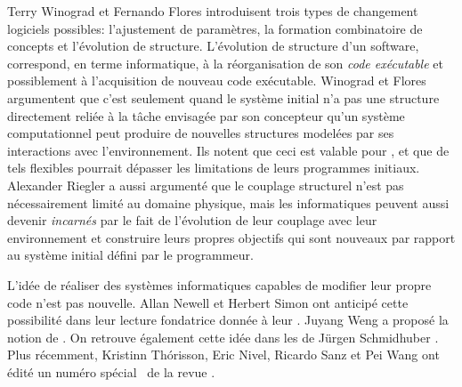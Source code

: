 Terry Winograd et Fernando Flores \cite{winograd_understanding_1987} introduisent trois types de changement logiciels possibles:  l'ajustement de paramètres, la formation combinatoire de concepts et l'évolution de structure.
L'évolution de structure d'un software, correspond, en terme informatique, à la réorganisation de son \emph{code exécutable} et possiblement à l'acquisition de nouveau code exécutable.
Winograd et Flores argumentent que c'est seulement quand le système initial n'a pas une structure directement reliée à la tâche envisagée par son concepteur qu'un système computationnel peut produire de nouvelles structures modelées par ses interactions avec l'environnement. 
Ils notent que ceci est valable pour \og {} \fg, et que de tels  flexibles pourrait dépasser les limitations de leurs programmes initiaux. 
Alexander Riegler \cite{riegler_when_2002} a aussi argumenté que le couplage structurel n'est pas nécessairement limité au domaine physique, mais les  informatiques peuvent aussi devenir \emph{incarnés} par le fait de l'évolution de leur couplage avec leur environnement et construire leurs propres objectifs qui sont nouveaux par rapport au système initial défini par le programmeur. 



L'idée de réaliser des systèmes informatiques capables de modifier leur propre code n'est pas nouvelle. 
Allan Newell et Herbert Simon ont anticipé cette possibilité dans leur lecture fondatrice donnée à leur  \cite{newell_computer_1976}. 
Juyang Weng a proposé la notion de  \cite{weng_developmental_2004}. 
On retrouve également cette idée dans les  de  Jürgen Schmidhuber \cite{schmidhuber_goedel_2003}.
Plus récemment, Kristinn Thórisson, Eric Nivel, Ricardo Sanz et Pei Wang ont édité un numéro spécial \og {} \fg\ de la revue  \cite{thorisson_self-programming_2012}. 

